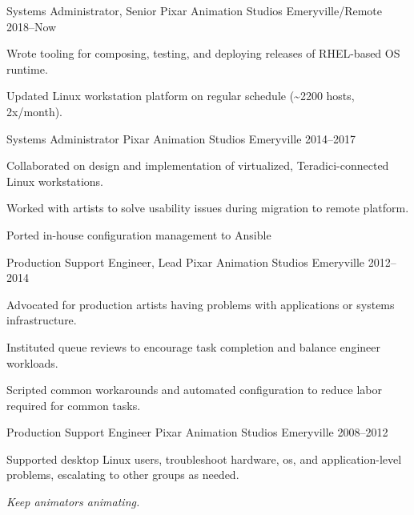 
\begin{cventries}

  \cventry
  {Systems Administrator, Senior}  %
  {Pixar Animation Studios}  %
  {Emeryville/Remote}  %
  {2018--Now}  %
  {
    \begin{cvitems}  %
    \item {Wrote tooling for composing, testing, and deploying releases of RHEL-based OS runtime.}
    \item {Updated Linux workstation platform on regular schedule (\textasciitilde{}2200 hosts, 2x/month).}
    \end{cvitems}
  }

  \cventry
  {Systems Administrator}
  {Pixar Animation Studios}
  {Emeryville}
  {2014--2017}
  {
    \begin{cvitems}
    \item {Collaborated on design and implementation of virtualized, Teradici-connected Linux workstations.}
    \item {Worked with artists to solve usability issues during migration to remote platform.}
    \item {Ported in-house configuration management to Ansible}
    \end{cvitems}
  }

  \cventry
  {Production Support Engineer, Lead}
  {Pixar Animation Studios}
  {Emeryville}
  {2012--2014}
  {
    \begin{cvitems}
    \item {Advocated for production artists having problems with applications or systems infrastructure.}
    \item {Instituted queue reviews to encourage task completion and balance engineer workloads.}
    \item {Scripted common workarounds and automated configuration to reduce labor required for common tasks.}
    \end{cvitems}
  }

  \cventry
  {Production Support Engineer}
  {Pixar Animation Studios}
  {Emeryville}
  {2008--2012}
  {
    \begin{cvitems}
    \item {Supported desktop Linux users, troubleshoot hardware, os, and application-level problems, escalating to other groups as needed.}
    \item {\textit{Keep animators animating.}}
    \end{cvitems}
  }

\end{cventries}
